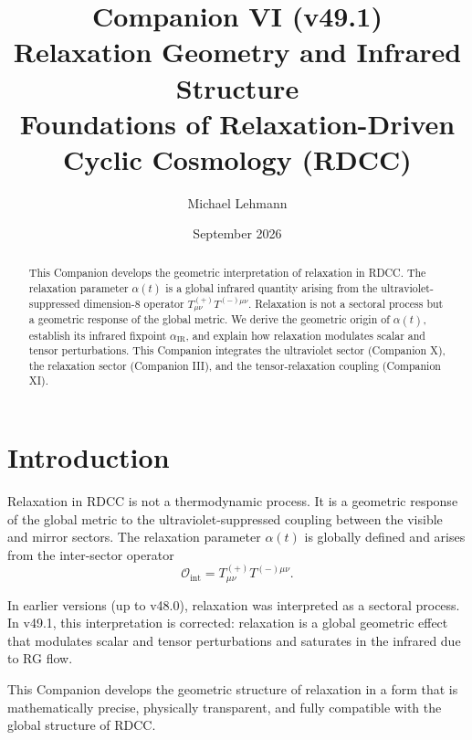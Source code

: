 \documentclass[11pt,a4paper]{article}
\title{\textbf{Companion VI (v49.1)}\\[0.2cm]
\textbf{Relaxation Geometry and Infrared Structure}\\[0.2cm]
\large Foundations of Relaxation-Driven Cyclic Cosmology (RDCC)}
\author[1]{Michael Lehmann}
\affil[1]{\small Independent Researcher, Relaxation-Driven Cyclic Cosmology (RDCC)\\
\texttt{mi.lehmann@gmx.de}}
\date{September 2026}
\begin{document}
\maketitle


\begin{abstract}
This Companion develops the geometric interpretation of relaxation in RDCC.
The relaxation parameter $\alpha(t)$ is a global infrared quantity arising from
the ultraviolet-suppressed dimension-8 operator $T^{(+)}_{\mu\nu}T^{(-)\mu\nu}$.
Relaxation is not a sectoral process but a geometric response of the global
metric. We derive the geometric origin of $\alpha(t)$, establish its infrared
fixpoint $\alpha_{\mathrm{IR}}$, and explain how relaxation modulates scalar
and tensor perturbations. This Companion integrates the ultraviolet sector
(Companion X), the relaxation sector (Companion III), and the tensor-relaxation
coupling (Companion XI).
\end{abstract}

\tableofcontents
\newpage

\section{Introduction}

Relaxation in RDCC is not a thermodynamic process. It is a geometric response
of the global metric to the ultraviolet-suppressed coupling between the visible
and mirror sectors. The relaxation parameter $\alpha(t)$ is globally defined
and arises from the inter-sector operator
\begin{equation}
\mathcal{O}_{\mathrm{int}} = T^{(+)}_{\mu\nu} T^{(-)\mu\nu}.
\end{equation}

In earlier versions (up to v48.0), relaxation was interpreted as a sectoral
process. In v49.1, this interpretation is corrected: relaxation is a global
geometric effect that modulates scalar and tensor perturbations and saturates
in the infrared due to RG flow.

This Companion develops the geometric structure of relaxation in a form that is
mathematically precise, physically transparent, and fully compatible with the
global structure of RDCC.
\end{document}
